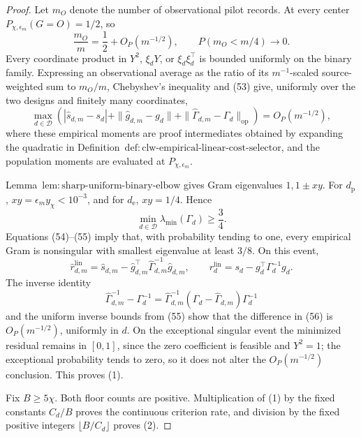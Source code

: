 \documentclass{article}
\begin{document}
\begin{proof}
Let \(m_O\) denote the number of observational pilot records.  At every center \(P_{\chi,\epsilon_m}(G=O)=1/2\), so
\[
 \frac{m_O}{m}=\frac12+O_P(m^{-1/2}),
 \qquad P(m_O<m/4)\longrightarrow0.                       \tag{53}
\]
Every coordinate product in \(Y^2\), \(\xi_dY\), or \(\xi_d\xi_d^\top\) is bounded uniformly on the binary family.  Expressing an observational average as the ratio of its \(m^{-1}\)-scaled source-weighted sum to \(m_O/m\), Chebyshev's inequality and (53) give, uniformly over the two designs and finitely many coordinates,
\[
 \max_{d\in\mathcal D}\left(
 |\widehat s_{d,m}-s_d|
 +\|\widehat g_{d,m}-g_d\|
 +\|\widehat\Gamma_{d,m}-\Gamma_d\|_{\mathrm{op}}
 \right)=O_P(m^{-1/2}),                                   \tag{54}
\]
where these empirical moments are proof intermediates obtained by expanding the quadratic in Definition~\(\mathrm{def{:}clw\text{-}empirical\text{-}linear\text{-}cost\text{-}selector}\), and the population moments are evaluated at \(P_{\chi,\epsilon_m}\).

Lemma~\(\mathrm{lem{:}sharp\text{-}uniform\text{-}binary\text{-}elbow}\) gives Gram eigenvalues \(1,1\pm xy\).  For \(d_{\mathrm p}\), \(xy=\epsilon_my_\chi<10^{-3}\), and for \(d_{\mathrm e}\), \(xy=1/4\).  Hence
\[
 \min_{d\in\mathcal D}\lambda_{\min}(\Gamma_d)\ge\frac34. \tag{55}
\]
Equations (54)--(55) imply that, with probability tending to one, every empirical Gram is nonsingular with smallest eigenvalue at least \(3/8\).  On this event,
\[
 \widehat r_{d,m}^{\mathrm{lin}}
 =\widehat s_{d,m}-\widehat g_{d,m}^\top
 \widehat\Gamma_{d,m}^{-1}\widehat g_{d,m},
 \qquad
 r_d^{\mathrm{lin}}=s_d-g_d^\top\Gamma_d^{-1}g_d.          \tag{56}
\]
The inverse identity
\[
 \widehat\Gamma_{d,m}^{-1}-\Gamma_d^{-1}
 =\widehat\Gamma_{d,m}^{-1}
 (\Gamma_d-\widehat\Gamma_{d,m})\Gamma_d^{-1}             \tag{57}
\]
and the uniform inverse bounds from (55) show that the difference in (56) is \(O_P(m^{-1/2})\), uniformly in \(d\).  On the exceptional singular event the minimized residual remains in \([0,1]\), since the zero coefficient is feasible and \(Y^2=1\); the exceptional probability tends to zero, so it does not alter the \(O_P(m^{-1/2})\) conclusion.  This proves (1).

Fix \(B\ge5\chi\).  Both floor counts are positive.  Multiplication of (1) by the fixed constants \(C_d/B\) proves the continuous criterion rate, and division by the fixed positive integers \(\lfloor B/C_d\rfloor\) proves (2).


\end{proof}
\end{document}
